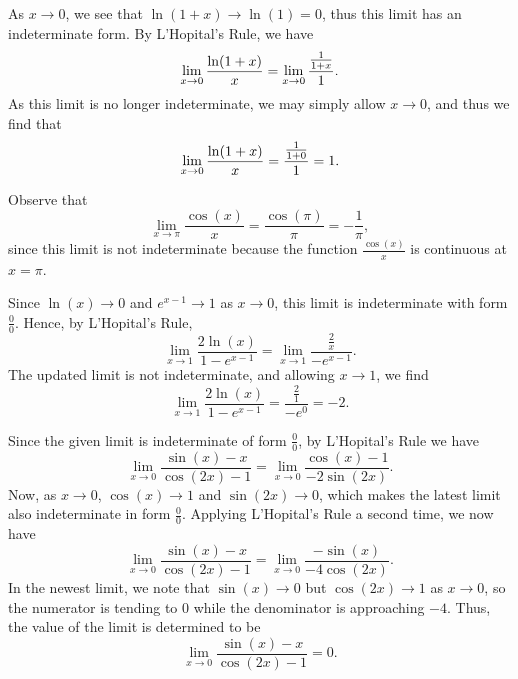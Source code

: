 \begin{activitySolution}
\ba
\item As $x \to 0$, we see that $\ln(1+x) \to \ln(1) = 0$, thus this limit has an indeterminate form.  By L'Hopital's Rule, we have
$$\displaystyle \lim_{x \to 0} \frac{\ln(1 + x)}{x} = \displaystyle \lim_{x \to 0} \frac{\frac{1}{1 + x}}{1}.$$
As this limit is no longer indeterminate, we may simply allow $x \to 0$, and thus we find that
$$\displaystyle \lim_{x \to 0} \frac{\ln(1 + x)}{x} = \frac{\frac{1}{1 + 0}}{1} = 1.$$
\item Observe that
$$\lim_{x \to \pi} \frac{\cos(x)}{x} = \frac{\cos(\pi)}{\pi} = -\frac{1}{\pi},$$
since this limit is not indeterminate because the function $\frac{\cos(x)}{x}$ is continuous at $x = \pi$.
\item Since $\ln(x) \to 0$ and $e^{x-1} \to 1$ as $x \to 0$, this limit is indeterminate with form $\frac{0}{0}$.  Hence, by L'Hopital's Rule, 
$$\lim_{x \to 1} \frac{2 \ln(x)}{1-e^{x-1}} = \lim_{x \to 1} \frac{\frac{2}{x}}{-e^{x-1}}.$$
The updated limit is not indeterminate, and allowing $x \to 1$, we find
$$\lim_{x \to 1} \frac{2 \ln(x)}{1-e^{x-1}} = \frac{\frac{2}{1}}{-e^{0}} = -2.$$ 
\item Since the given limit is indeterminate of form $\frac{0}{0}$, by L'Hopital's Rule we have
$$\lim_{x \to 0} \frac{\sin(x) - x}{\cos(2x)-1} =  \lim_{x \to 0} \frac{\cos(x) - 1}{-2\sin(2x)}.$$
Now, as $x \to 0$, $\cos(x) \to 1$ and $\sin(2x) \to 0$, which makes the latest limit also indeterminate in form $\frac{0}{0}$.  Applying L'Hopital's Rule a second time, we now have
$$\lim_{x \to 0} \frac{\sin(x) - x}{\cos(2x)-1} =  \lim_{x \to 0} \frac{-\sin(x)}{-4\cos(2x)}.$$
In the newest limit, we note that $\sin(x) \to 0$ but $\cos(2x) \to 1$ as $x \to 0$, so the numerator is tending to 0 while the denominator is approaching $-4$.  Thus, the value of the limit is determined to be
$$\lim_{x \to 0} \frac{\sin(x) - x}{\cos(2x)-1} =  0.$$
\ea
\end{activitySolution}
\aftera
